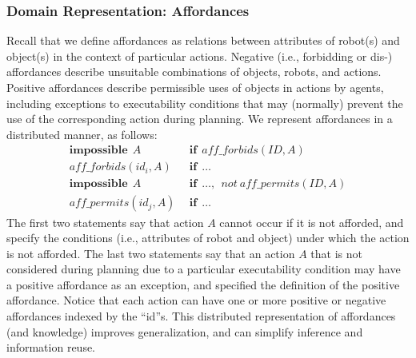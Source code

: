 \documentclass{article}
\newcounter{ctr}
\begin{document}
\subsubsection{Domain Representation: Affordances} 
Recall that we define affordances as relations between attributes of
robot(s) and object(s) in the context of particular actions. Negative
(i.e., forbidding or dis-) affordances describe unsuitable
combinations of objects, robots, and actions. Positive affordances
describe permissible uses of objects in actions by agents, including
exceptions to executability conditions that may (normally) prevent the
use of the corresponding action during planning. We represent
affordances in a distributed manner, as follows:
\begin{align*}
  \mathbf{impossible}~~ A &~~\mathbf{if}~~ af\!\!f\_forbids(ID,
  A)\\
  af\!\!f\_forbids(id_i, A) &~~\mathbf{if}~~ \ldots\\
  \mathbf{impossible}~~ A &~~\mathbf{if}~~
  \ldots,~~not~af\!\!f\_permits(ID, A)\\
  af\!\!f\_permits(id_j, A)&~~\mathbf{if}~~ \ldots
\end{align*}
The first two statements say that action $A$ cannot occur if it is not
afforded, and specify the conditions (i.e., attributes of robot and
object) under which the action is not afforded. The last two
statements say that an action $A$ that is not considered during
planning due to a particular executability condition may have a
positive affordance as an exception, and specified the definition of
the positive affordance. Notice that each action can have one or more
positive or negative affordances indexed by the ``id''s. %
This distributed representation of affordances (and knowledge)
improves generalization, and can simplify inference and information
reuse.
\end{document}
